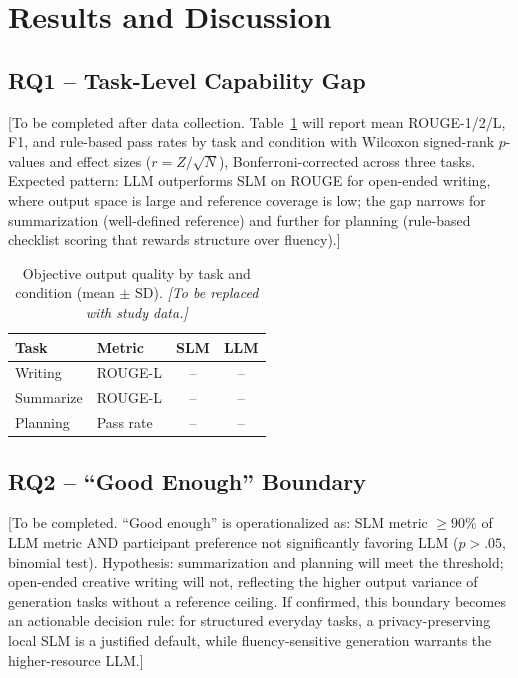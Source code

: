 \section{Results and Discussion}

\subsection{RQ1 -- Task-Level Capability Gap}

[To be completed after data collection.
Table~\ref{tab:metrics} will report mean ROUGE-1/2/L, F1, and rule-based pass
rates by task and condition with Wilcoxon signed-rank $p$-values and effect
sizes ($r = Z/\sqrt{N}$), Bonferroni-corrected across three tasks.
Expected pattern: LLM outperforms SLM on ROUGE for open-ended writing, where
output space is large and reference coverage is low; the gap narrows for
summarization (well-defined reference) and further for planning (rule-based
checklist scoring that rewards structure over fluency).]

\begin{table}[t]
  \caption{Objective output quality by task and condition (mean $\pm$ SD).
           \textit{[To be replaced with study data.]}}
  \label{tab:metrics}
  \small
  \begin{tabular}{llcc}
    \toprule
    Task & Metric & SLM & LLM \\
    \midrule
    Writing    & ROUGE-L   & -- & -- \\
    Summarize  & ROUGE-L   & -- & -- \\
    Planning   & Pass rate & -- & -- \\
    \bottomrule
  \end{tabular}
\end{table}

\subsection{RQ2 -- ``Good Enough'' Boundary}

[To be completed.
``Good enough'' is operationalized as: SLM metric $\geq 90\%$ of LLM metric
AND participant preference not significantly favoring LLM ($p > .05$,
binomial test).
Hypothesis: summarization and planning will meet the threshold; open-ended
creative writing will not, reflecting the higher output variance of generation
tasks without a reference ceiling.
If confirmed, this boundary becomes an actionable decision rule: for
structured everyday tasks, a privacy-preserving local SLM is a justified
default, while fluency-sensitive generation warrants the higher-resource LLM.]

